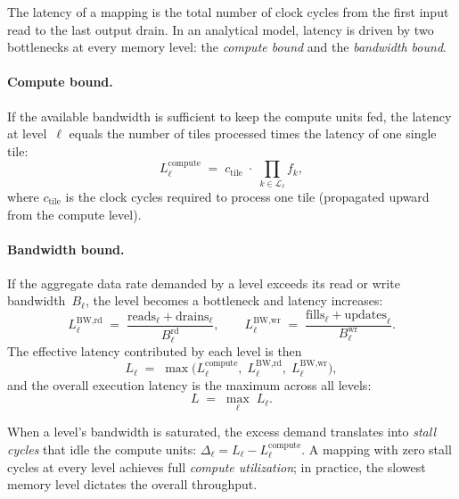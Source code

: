 The latency of a mapping is the total number of clock cycles from the first
input read to the last output drain.
In an analytical model, latency is driven by two bottlenecks at every memory
level: the \emph{compute bound} and the \emph{bandwidth bound}.

\paragraph{Compute bound.}
If the available bandwidth is sufficient to keep the compute units fed, the
latency at level~$\ell$ equals the number of tiles processed times the
latency of one single tile:
\begin{equation}
\label{eq:lat-compute}
L_\ell^{\text{compute}} \;=\; c_{\text{tile}} \;\cdot\;
  \prod_{k \in \mathcal{L}_\ell} f_k,
\end{equation}
where $c_{\text{tile}}$ is the clock cycles required to process one tile
(propagated upward from the compute level).

\paragraph{Bandwidth bound.}
If the aggregate data rate demanded by a level exceeds its read or write
bandwidth~$B_\ell$, the level becomes a bottleneck and latency increases:
\begin{equation}
\label{eq:lat-bw}
L_\ell^{\text{BW,rd}}
  \;=\; \frac{\text{reads}_\ell + \text{drains}_\ell}{B_\ell^{\text{rd}}},
\qquad
L_\ell^{\text{BW,wr}}
  \;=\; \frac{\text{fills}_\ell + \text{updates}_\ell}{B_\ell^{\text{wr}}}.
\end{equation}
The effective latency contributed by each level is then
\begin{equation}
\label{eq:lat-level}
L_\ell \;=\; \max\!\bigl(L_\ell^{\text{compute}},\;
  L_\ell^{\text{BW,rd}},\; L_\ell^{\text{BW,wr}}\bigr),
\end{equation}
and the overall execution latency is the maximum across all levels:
\begin{equation}
\label{eq:latency}
L \;=\; \max_\ell\; L_\ell.
\end{equation}

When a level's bandwidth is saturated, the excess demand translates into
\emph{stall cycles} that idle the compute units:
$\Delta_\ell = L_\ell - L_\ell^{\text{compute}}$.
A mapping with zero stall cycles at every level achieves full
\emph{compute utilization}; in practice, the slowest memory level dictates
the overall throughput.

